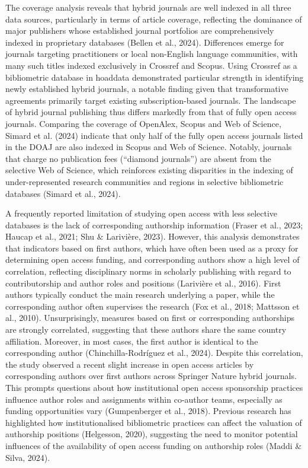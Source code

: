 \documentclass[a4paper,man,floatsintext,longtable,noextraspace,10pt]{apa6}
\begin{document}
The coverage analysis reveals that hybrid journals are well indexed in
all three data sources, particularly in terms of article coverage,
reflecting the dominance of major publishers whose established journal
portfolios are comprehensively indexed in proprietary databases (Bellen
et al., 2024). Differences emerge for journals targeting practitioners
or local non-English language communities, with many such titles indexed
exclusively in Crossref and Scopus. Using Crossref as a bibliometric
database in hoaddata demonstrated particular strength in identifying
newly established hybrid journals, a notable finding given that
transformative agreements primarily target existing subscription-based
journals. The landscape of hybrid journal publishing thus differs
markedly from that of fully open access journals. Comparing the coverage
of OpenAlex, Scopus and Web of Science, Simard et al. (2024) indicate
that only half of the fully open access journals listed in the DOAJ are
also indexed in Scopus and Web of Science. Notably, journals that charge
no publication fees (``diamond journals'') are absent from the selective
Web of Science, which reinforces existing disparities in the indexing of
under-represented research communities and regions in selective
bibliometric databases (Simard et al., 2024).

A frequently reported limitation of studying open access with less
selective databases is the lack of corresponding authorship information
(Fraser et al., 2023; Haucap et al., 2021; Shu \& Larivière, 2023).
However, this analysis demonstrates that indicators based on first
authors, which have often been used as a proxy for determining open
access funding, and corresponding authors show a high level of
correlation, reflecting disciplinary norms in scholarly publishing with
regard to contributorship and author roles and positions (Larivière et
al., 2016). First authors typically conduct the main research underlying
a paper, while the corresponding author often supervises the research
(Fox et al., 2018; Mattsson et al., 2010). Unsurprisingly, measures
based on first or corresponding authorships are strongly correlated,
suggesting that these authors share the same country affiliation.
Moreover, in most cases, the first author is identical to the
corresponding author (Chinchilla-Rodríguez et al., 2024). Despite this
correlation, the study observed a recent slight increase in open access
articles by corresponding authors over first authors across Springer
Nature hybrid journals. This prompts questions about how institutional
open access sponsorship practices influence author roles and assignments
within co-author teams, especially as funding opportunities vary
(Gumpenberger et al., 2018). Previous research has highlighted how
institutionalised bibliometric practices can affect the valuation of
authorship positions (Helgesson, 2020), suggesting the need to monitor
potential influences of the availability of open access funding on
authorship roles (Maddi \& Silva, 2024).
\end{document}
